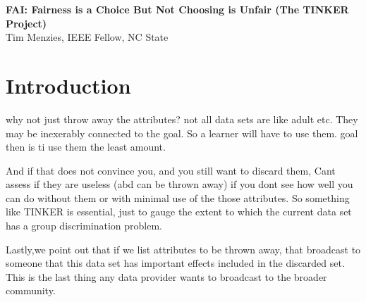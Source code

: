 \documentclass{NSF}
\newcommand{\TITLE}{FAI:  Fairness is a Choice But Not
Choosing is Unfair (The TINKER Project)}
\begin{document}
\begin{nsfdescription}
\thispagestyle{plain}
 \begin{center}
{\bf \TITLE}\\\vspace{1mm}
{Tim Menzies,  IEEE Fellow,  NC State}
 \end{center}


 



 \section{Introduction}\label{tion:intro}
 why not just throw away the attributes? not all data sets are like adult etc. They may be inexerably
 connected to the goal. So a learner will have to use them. goal then is ti use them the least amount.
 
And if that does not convince you, and you still want to discard them, Cant assess if they are useless (abd can be thrown away) if you dont see how well you can do without them or with minimal use of the those attributes. So something like TINKER is essential, just to gauge the extent to which the current data set has a group discrimination problem.

Lastly,we point out that if we list attributes to be thrown away, that broadcast to someone that this data set has important effects included in the 
discarded set. This is the last thing any data provider wants to broadcast to the broader community.



\end{nsfdescription}
\end{document}
